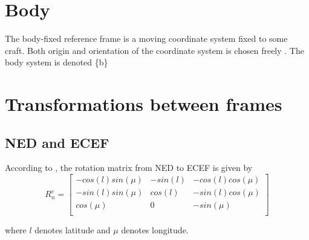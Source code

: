 \section{Body}
    The body-fixed reference frame is a moving coordinate system fixed to some craft. Both origin and orientation of the coordinate system is chosen freely . The body system is denoted \{b\}

\section{Transformations between frames}
    \subsection{NED and ECEF}
        \label{app:roten}
        According to \cite{fossen2011handbook}, the rotation matrix from NED to ECEF is given by 
        \begin{equation}
            \label{eq:Ren}
            R^e_n =
            \begin{bmatrix}
                -cos(l)sin(\mu) & -sin(l)   & -cos(l)cos(\mu)\\
                -sin(l)sin(\mu) & cos(l)    & -sin(l)cos(\mu)\\
                cos(\mu)       & 0          & -sin(\mu)\\
            \end{bmatrix}
        \end{equation}
        
        where $l$ denotes latitude and $\mu$ denotes longitude.
    
